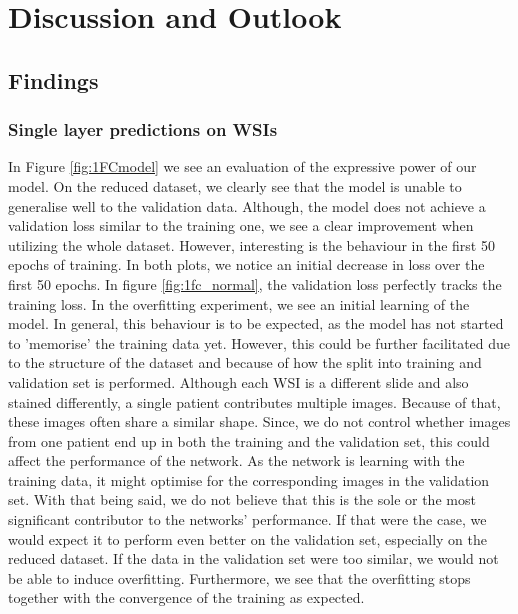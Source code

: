 
\chapter{Discussion and Outlook}
  \label{Discussion}
  
\section{Findings}

\subsection{Single layer predictions on WSIs}

In Figure \ref{fig:1FCmodel} we see an evaluation of the expressive power of our model. On the reduced dataset, we clearly see that the model is unable to generalise well to the validation data. Although, the model does not achieve a validation loss similar to the training one, we see a clear improvement when utilizing the whole dataset. However, interesting is the behaviour in the first 50 epochs of training. In both plots, we notice an initial decrease in loss over the first 50 epochs. In figure \ref{fig:1fc_normal}, the validation loss perfectly tracks the training loss. In the overfitting experiment, we see an initial learning of the model. In general, this behaviour is to be expected, as the model has not started to 'memorise' the training data yet. However, this could be further facilitated due to the structure of the dataset and because of how the split into training and validation set is performed. Although each WSI is a different slide and also stained differently, a single patient contributes multiple images. Because of that, these images often share a similar shape. Since, we do not control whether images from one patient end up in both the training and the validation set, this could affect the performance of the network. As the network is learning with the training data, it might optimise for the corresponding images in the validation set. With that being said, we do not believe that this is the sole or the most significant contributor to the networks' performance. If that were the case, we would expect it to perform even better on the validation set, especially on the reduced dataset. If the data in the validation set were too similar, we would not be able to induce overfitting. Furthermore, we see that the overfitting stops together with the convergence of the training as expected.

